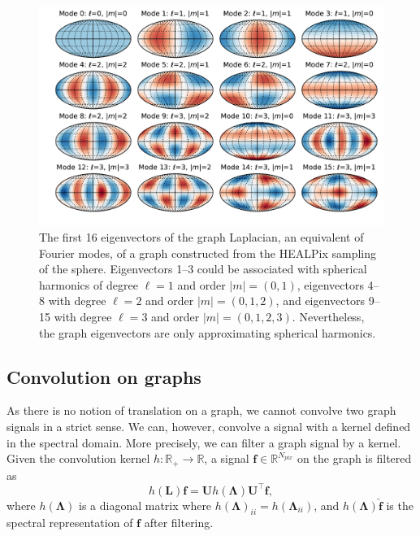 \documentclass[final,twocolumn,3p,times,authoryear]{elsarticle}
\renewcommand{\b}[1]{{\bm{#1}}}   %
\newcommand{\1}{\b{1}}              %
\newcommand{\0}{\b{0}}              %
\renewcommand{\L}{\b{L}}
\newcommand{\U}{\b{U}}
\newcommand{\f}{\b{f}}
\newcommand{\trans}{^\intercal}
\newcommand{\R}{\mathbb{R}}
\newcommand{\bLambda}{\b{\Lambda}}
\begin{document}
\begin{figure}
	\centering
	\includegraphics[width=\linewidth]{eigenvectors}
	\caption{The first 16 eigenvectors of the graph Laplacian, an equivalent of Fourier modes, of a graph constructed from the HEALPix sampling of the sphere.
    Eigenvectors 1--3 could be associated with spherical harmonics of degree $\ell=1$ and order $|m|=(0,1)$, eigenvectors 4--8 with degree $\ell=2$ and order $|m|=(0,1,2)$, and eigenvectors 9--15 with degree $\ell=3$ and order $|m|=(0,1,2,3)$.
    Nevertheless, the graph eigenvectors are only approximating spherical harmonics.}
	\label{fig:graph_harmonics}
\end{figure}

\subsection{Convolution on graphs}
\label{sec:graph_convolution}


As there is no notion of translation on a graph, we cannot convolve two graph signals in a strict sense.
We can, however, convolve a signal with a kernel defined in the spectral domain.
More precisely, we can filter a graph signal by a kernel.
Given the convolution kernel
$h: \R_+ \rightarrow \R$, a signal $\f \in \R^{N_{pix}}$ on the graph is filtered as
\begin{equation} \label{eqn:graph_convolution_fourier}
	h(\L) \f = \U h(\bLambda) \U\trans \f,
\end{equation}
where $h(\bLambda)$ is a diagonal matrix where $h(\bLambda)_{ii} = h(\bLambda_{ii})$, and $h(\bLambda) \hat{\f}$ is the spectral representation of $\f$ after filtering.
\end{document}
